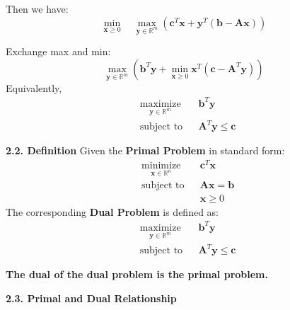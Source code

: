 \documentclass[11pt,a4paper]{article}
\begin{document}
Then we have: \[ \min_{\boldsymbol{x} \geq 0} \quad \max_{\boldsymbol{y} \in \mathbb{R}^m} \left( \boldsymbol{c}^T \boldsymbol{x} + \boldsymbol{y}^T (\boldsymbol{b} - \boldsymbol{Ax}) \right) \]

Exchange max and min: \[
\max_{\boldsymbol{y} \in \mathbb{R}^m} \left( \boldsymbol{b}^T \boldsymbol{y} + \min_{\boldsymbol{x} \geq 0} \boldsymbol{x}^T (\boldsymbol{c} - \boldsymbol{A}^T \boldsymbol{y}) \right)
\] Equivalently, \[
\begin{aligned}
& \underset{\boldsymbol{y} \in \mathbb{R}^
m}{\text{maximize}} & & \boldsymbol{b}^T \boldsymbol{y} \\
& \text{subject to} & & \boldsymbol{A}^T \boldsymbol{y} \leq \boldsymbol{c}
\end{aligned}
\]

\textbf{2.2. Definition} Given the \textbf{Primal Problem} in standard form: \[
\begin{aligned}
& \underset{\boldsymbol{x} \in \mathbb{R}^n}{\text{minimize}} & & \boldsymbol{c}^T \boldsymbol{x} \\
& \text{subject to} & & \boldsymbol{A x} = \boldsymbol{b} \\
& & & \boldsymbol{x} \geq 0
\end{aligned}
\] The corresponding \textbf{Dual Problem} is defined as: \[
\begin{aligned}
& \underset{\boldsymbol{y} \in \mathbb{R}^m}{\text{maximize}} & & \boldsymbol{b}^T \boldsymbol{y} \\
& \text{subject to} & & \boldsymbol{A}^T \boldsymbol{y} \leq \boldsymbol{c}
\end{aligned}
\]

\textbf{The dual of the dual problem is the primal problem.}

\textbf{2.3. Primal and Dual Relationship}
\end{document}
